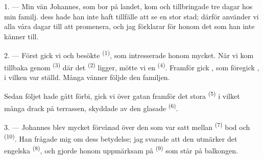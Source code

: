 %

\VUsaut{4.0mm}
\VUsaut{3.0mm}

\VUsaut{3.0mm}

1. --- Min vän Johannes, som bor på landet, kom och tillbringade tre dagar hos min familj.
 dess hade han inte haft tillfälle att se en stor stad; därför använder vi alla
våra dagar till att promenera, och jag förklarar för honom det som han inte känner till.

2. --- Först gick vi och besökte  \textsuperscript{(1)}, som
intresserade honom mycket. När vi kom tillbaka genom  \textsuperscript{(3)} där
det  \textsuperscript{(2)} ligger, mötte vi en 
\textsuperscript{(4)}. Framför
 gick , som föregick
, i vilken  var ställd. Många vänner följde den
 familjen.

Sedan följet hade gått förbi, gick vi över gatan framför det stora
 \textsuperscript{(5)} i vilket många  drack
 på terrassen, skyddade av den glasade 
\textsuperscript{(6)}.

3. --- Johannes blev mycket förvånad över den  som var satt mellan
 \textsuperscript{(7)} bod och
 \textsuperscript{(10)}. Han frågade mig om dess
betydelse; jag svarade att den utmärker det engelska 
\textsuperscript{(8)}, och gjorde honom uppmärksam på  \textsuperscript{(9)}
som står på balkongen.

